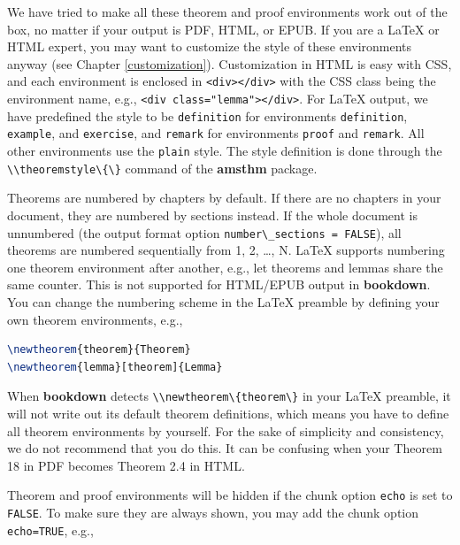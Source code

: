 \documentclass[doctor,openright,twoside]{sjtuthesis}
\newcommand{\passthrough}[1]{#1}
\theoremstyle{plain}
\theoremstyle{definition}
\theoremstyle{remark}
\theoremstyle{ocrenumbox}
\theoremstyle{plain}
\begin{document}
We have tried to make all these theorem and proof environments work out
of the box, no matter if your output is PDF, HTML, or EPUB. If you are a
LaTeX or HTML expert, you may want to customize the style of these
environments anyway (see Chapter \ref{customization}). Customization in
HTML is easy with CSS, and each environment is enclosed in
\passthrough{\lstinline!<div></div>!} with the CSS class being the
environment name, e.g.,
\passthrough{\lstinline!<div class="lemma"></div>!}. For LaTeX output,
we have predefined the style to be \passthrough{\lstinline!definition!}
for environments \passthrough{\lstinline!definition!},
\passthrough{\lstinline!example!}, and
\passthrough{\lstinline!exercise!}, and \passthrough{\lstinline!remark!}
for environments \passthrough{\lstinline!proof!} and
\passthrough{\lstinline!remark!}. All other environments use the
\passthrough{\lstinline!plain!} style. The style definition is done
through the \passthrough{\lstinline!\\theoremstyle\{\}!} command of the
\textbf{amsthm} package.

Theorems are numbered by chapters by default. If there are no chapters
in your document, they are numbered by sections instead. If the whole
document is unnumbered (the output format option
\passthrough{\lstinline!number\_sections = FALSE!}), all theorems are
numbered sequentially from 1, 2, \ldots{}, N. LaTeX supports numbering
one theorem environment after another, e.g., let theorems and lemmas
share the same counter. This is not supported for HTML/EPUB output in
\textbf{bookdown}. You can change the numbering scheme in the LaTeX
preamble by defining your own theorem environments, e.g.,

\begin{lstlisting}[language=TeX]
\newtheorem{theorem}{Theorem}
\newtheorem{lemma}[theorem]{Lemma}
\end{lstlisting}

When \textbf{bookdown} detects
\passthrough{\lstinline!\\newtheorem\{theorem\}!} in your LaTeX
preamble, it will not write out its default theorem definitions, which
means you have to define all theorem environments by yourself. For the
sake of simplicity and consistency, we do not recommend that you do
this. It can be confusing when your Theorem 18 in PDF becomes Theorem
2.4 in HTML.

Theorem and proof environments will be hidden if the chunk option
\passthrough{\lstinline!echo!} is set to
\passthrough{\lstinline!FALSE!}. To make sure they are always shown, you
may add the chunk option \passthrough{\lstinline!echo=TRUE!}, e.g.,
\end{document}
